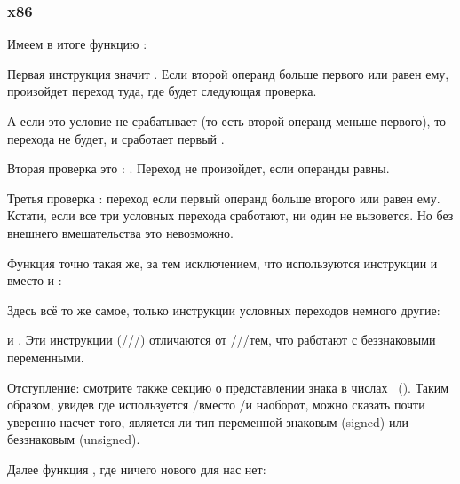 \subsubsection{x86}


Имеем в итоге функцию :



Первая инструкция \JLE значит . 
Если второй операнд больше первого или равен ему, произойдет переход туда, где будет следующая проверка.

А если это условие не срабатывает (то есть второй операнд меньше первого), то перехода не будет, 
и сработает первый \printf.

Вторая проверка это \JNE: .
Переход не произойдет, если операнды равны.

Третья проверка \JGE: \EMDASH{}переход 
если первый операнд больше второго или равен ему.
Кстати, если все три условных перехода сработают, ни один \printf не вызовется. 
Но без внешнего вмешательства это невозможно.

Функция  точно такая же, за тем исключением, что используются инструкции 
\JBE и \JAE вместо \JLE и \JGE:



Здесь всё то же самое, только инструкции условных переходов немного другие:

\JBE\EMDASH{} и \JAE\EMDASH{}.
Эти инструкции (\JA/\JAE/\JB/\JBE) 
отличаются от \JG/\JGE/\JL/\JLE тем, что работают с беззнаковыми переменными.

Отступление: смотрите также секцию о представлении знака в числах ~().
Таким образом, увидев где используется \JG/\JL вместо \JA/\JB и наоборот, 
можно сказать почти уверенно насчет того, 
является ли тип переменной знаковым (signed) или беззнаковым (unsigned).

Далее функция \main, где ничего нового для нас нет:

